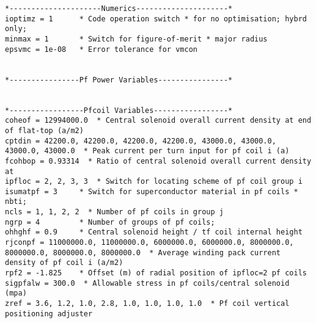 \documentclass[11pt,a4paper]{report}
\begin{document}
\begin{verbatim}
*---------------------Numerics---------------------*
ioptimz = 1      * Code operation switch * for no optimisation; hybrd only;
minmax = 1       * Switch for figure-of-merit * major radius
epsvmc = 1e-08   * Error tolerance for vmcon


*----------------Pf Power Variables----------------*


*-----------------Pfcoil Variables-----------------*
coheof = 12994000.0  * Central solenoid overall current density at end of flat-top (a/m2)
cptdin = 42200.0, 42200.0, 42200.0, 42200.0, 43000.0, 43000.0, 43000.0, 43000.0  * Peak current per turn input for pf coil i (a)
fcohbop = 0.93314  * Ratio of central solenoid overall current density at
ipfloc = 2, 2, 3, 3  * Switch for locating scheme of pf coil group i
isumatpf = 3     * Switch for superconductor material in pf coils * nbti;
ncls = 1, 1, 2, 2  * Number of pf coils in group j
ngrp = 4         * Number of groups of pf coils;
ohhghf = 0.9     * Central solenoid height / tf coil internal height
rjconpf = 11000000.0, 11000000.0, 6000000.0, 6000000.0, 8000000.0, 8000000.0, 8000000.0, 8000000.0  * Average winding pack current density of pf coil i (a/m2)
rpf2 = -1.825    * Offset (m) of radial position of ipfloc=2 pf coils
sigpfalw = 300.0  * Allowable stress in pf coils/central solenoid (mpa)
zref = 3.6, 1.2, 1.0, 2.8, 1.0, 1.0, 1.0, 1.0  * Pf coil vertical positioning adjuster



\end{verbatim}
\end{document}
